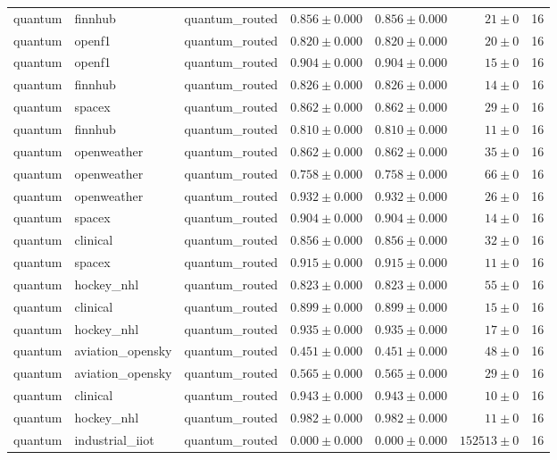 \begin{table}[htbp]
\begin{tabular}{l l l r r r r}
quantum & finnhub & quantum\_routed & $0.856\pm0.000$ & $0.856\pm0.000$ & $21\pm0$ & 16 \\
quantum & openf1 & quantum\_routed & $0.820\pm0.000$ & $0.820\pm0.000$ & $20\pm0$ & 16 \\
quantum & openf1 & quantum\_routed & $0.904\pm0.000$ & $0.904\pm0.000$ & $15\pm0$ & 16 \\
quantum & finnhub & quantum\_routed & $0.826\pm0.000$ & $0.826\pm0.000$ & $14\pm0$ & 16 \\
quantum & spacex & quantum\_routed & $0.862\pm0.000$ & $0.862\pm0.000$ & $29\pm0$ & 16 \\
quantum & finnhub & quantum\_routed & $0.810\pm0.000$ & $0.810\pm0.000$ & $11\pm0$ & 16 \\
quantum & openweather & quantum\_routed & $0.862\pm0.000$ & $0.862\pm0.000$ & $35\pm0$ & 16 \\
quantum & openweather & quantum\_routed & $0.758\pm0.000$ & $0.758\pm0.000$ & $66\pm0$ & 16 \\
quantum & openweather & quantum\_routed & $0.932\pm0.000$ & $0.932\pm0.000$ & $26\pm0$ & 16 \\
quantum & spacex & quantum\_routed & $0.904\pm0.000$ & $0.904\pm0.000$ & $14\pm0$ & 16 \\
quantum & clinical & quantum\_routed & $0.856\pm0.000$ & $0.856\pm0.000$ & $32\pm0$ & 16 \\
quantum & spacex & quantum\_routed & $0.915\pm0.000$ & $0.915\pm0.000$ & $11\pm0$ & 16 \\
quantum & hockey\_nhl & quantum\_routed & $0.823\pm0.000$ & $0.823\pm0.000$ & $55\pm0$ & 16 \\
quantum & clinical & quantum\_routed & $0.899\pm0.000$ & $0.899\pm0.000$ & $15\pm0$ & 16 \\
quantum & hockey\_nhl & quantum\_routed & $0.935\pm0.000$ & $0.935\pm0.000$ & $17\pm0$ & 16 \\
quantum & aviation\_opensky & quantum\_routed & $0.451\pm0.000$ & $0.451\pm0.000$ & $48\pm0$ & 16 \\
quantum & aviation\_opensky & quantum\_routed & $0.565\pm0.000$ & $0.565\pm0.000$ & $29\pm0$ & 16 \\
quantum & clinical & quantum\_routed & $0.943\pm0.000$ & $0.943\pm0.000$ & $10\pm0$ & 16 \\
quantum & hockey\_nhl & quantum\_routed & $0.982\pm0.000$ & $0.982\pm0.000$ & $11\pm0$ & 16 \\
quantum & industrial\_iiot & quantum\_routed & $0.000\pm0.000$ & $0.000\pm0.000$ & $152513\pm0$ & 16 \\

\end{tabular}
\end{table}
